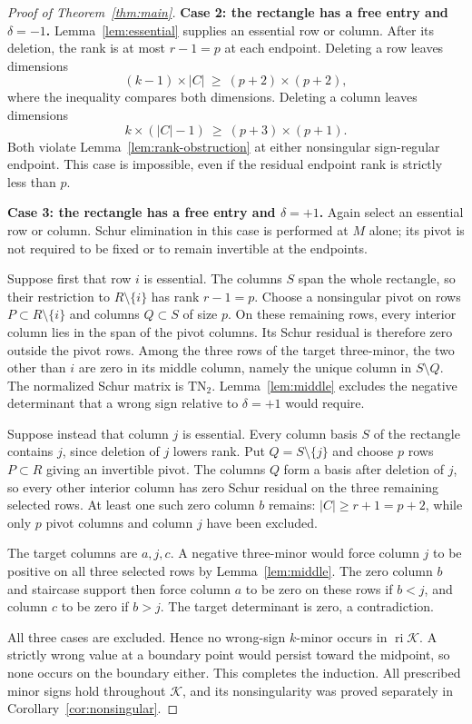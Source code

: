 \documentclass[11pt]{article}
\theoremstyle{definition}
\theoremstyle{remark}
\numberwithin{equation}{section}
\newcommand{\K}{\mathcal K}
\DeclareMathOperator{\ri}{ri}
\begin{document}
\begin{proof}[Proof of Theorem~\ref{thm:main}]
\medskip\noindent
\textbf{Case 2: the rectangle has a free entry and $\delta=-1$.}
Lemma~\ref{lem:essential} supplies an essential row or column.
After its deletion, the rank is at most $r-1=p$ at each
endpoint. Deleting a row leaves dimensions
\[
 (k-1)\times|C|\ \geq\ (p+2)\times(p+2),
\]
where the inequality compares both dimensions. Deleting a
column leaves dimensions
\[
 k\times(|C|-1)\ \geq\ (p+3)\times(p+1).
\]
Both violate Lemma~\ref{lem:rank-obstruction} at either
nonsingular sign-regular endpoint. This case is impossible,
even if the residual endpoint rank is strictly less than $p$.

\medskip\noindent
\textbf{Case 3: the rectangle has a free entry and $\delta=+1$.}
Again select an essential row or column. Schur elimination in
this case is performed at $M$ alone; its pivot is not required
to be fixed or to remain invertible at the endpoints.

Suppose first that row $i$ is essential. The columns $S$ span
the whole rectangle, so their restriction to $R\setminus\{i\}$
has rank $r-1=p$. Choose a nonsingular pivot on rows
$P\subset R\setminus\{i\}$ and columns $Q\subset S$ of
size $p$. On these remaining rows, every interior column lies
in the span of the pivot columns. Its Schur residual is
therefore zero outside the pivot rows. Among the three rows
of the target three-minor, the two other than $i$ are zero
in its middle column, namely the unique column in
$S\setminus Q$. The normalized Schur matrix is
$\mathrm{TN}_2$. Lemma~\ref{lem:middle} excludes the negative
determinant that a wrong sign relative to $\delta=+1$ would
require.

Suppose instead that column $j$ is essential. Every column
basis $S$ of the rectangle contains $j$, since deletion of
$j$ lowers rank. Put $Q=S\setminus\{j\}$ and choose $p$
rows $P\subset R$ giving an invertible pivot. The columns
$Q$ form a basis after deletion of $j$, so every other
interior column has zero Schur residual on the three
remaining selected rows. At least one such zero column
$b$ remains: $|C|\geq r+1=p+2$, while only $p$ pivot
columns and column $j$ have been excluded.

The target columns are $a,j,c$. A negative three-minor would
force column $j$ to be positive on all three selected rows by
Lemma~\ref{lem:middle}. The zero column $b$ and staircase
support then force column $a$ to be zero on these rows if
$b<j$, and column $c$ to be zero if $b>j$. The target
determinant is zero, a contradiction.

All three cases are excluded. Hence no wrong-sign $k$-minor
occurs in $\ri\K$. A strictly wrong value at a boundary point
would persist toward the midpoint, so none occurs on the
boundary either. This completes the induction. All prescribed
minor signs hold throughout $\K$, and its nonsingularity was
proved separately in Corollary~\ref{cor:nonsingular}.
\end{proof}
\end{document}
